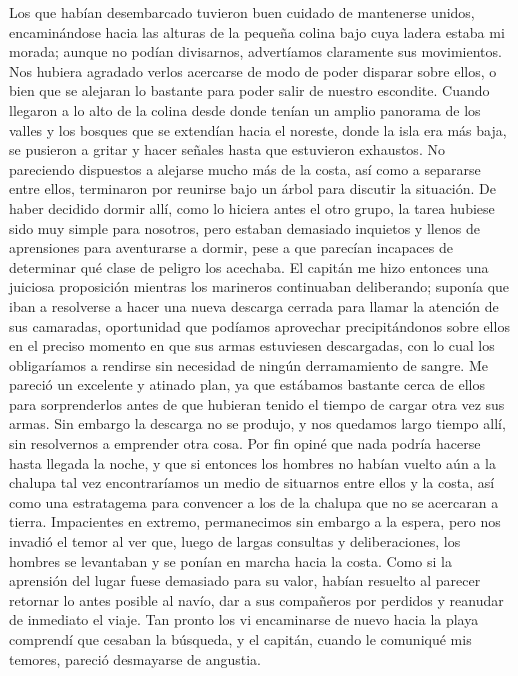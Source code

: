 \documentclass{novela}
\begin{document}
    Los que habían desembarcado tuvieron buen cuidado de mantenerse unidos, encaminándose hacia las alturas de la pequeña colina bajo cuya ladera estaba mi morada; aunque no podían divisarnos, advertíamos claramente sus movimientos. Nos hubiera agradado verlos acercarse de modo de poder disparar sobre ellos, o bien que se alejaran lo bastante para poder salir de nuestro escondite.
    Cuando llegaron a lo alto de la colina desde donde tenían un amplio panorama de los valles y los bosques que se extendían hacia el noreste, donde la isla era más baja, se pusieron a gritar y hacer señales hasta que estuvieron exhaustos. No pareciendo dispuestos a alejarse mucho más de la costa, así como a separarse entre ellos, terminaron por reunirse bajo un árbol para discutir la situación. De haber decidido dormir allí, como lo hiciera antes el otro grupo, la tarea hubiese sido muy simple para nosotros, pero estaban demasiado inquietos y llenos de aprensiones para aventurarse a dormir, pese a que parecían incapaces de determinar qué clase de peligro los acechaba.
    El capitán me hizo entonces una juiciosa proposición mientras los marineros continuaban deliberando; suponía que iban a resolverse a hacer una nueva descarga cerrada para llamar la atención de sus camaradas, oportunidad que podíamos aprovechar precipitándonos sobre ellos en el preciso momento en que sus armas estuviesen descargadas, con lo cual los obligaríamos a rendirse sin necesidad de ningún derramamiento de sangre.
    Me pareció un excelente y atinado plan, ya que estábamos bastante cerca de ellos para sorprenderlos antes de que hubieran tenido el tiempo de cargar otra vez sus armas.
    Sin embargo la descarga no se produjo, y nos quedamos largo tiempo allí, sin resolvernos a emprender otra cosa. Por fin opiné que nada podría hacerse hasta llegada la noche, y que si entonces los hombres no habían vuelto aún a la chalupa tal vez encontraríamos un medio de situarnos entre ellos y la costa, así como una estratagema para convencer a los de la chalupa que no se acercaran a tierra.
    Impacientes en extremo, permanecimos sin embargo a la espera, pero nos invadió el temor al ver que, luego de largas consultas y deliberaciones, los hombres se levantaban y se ponían en marcha hacia la costa. Como si la aprensión del lugar fuese demasiado para su valor, habían resuelto al parecer retornar lo antes posible al navío, dar a sus compañeros por perdidos y reanudar de inmediato el viaje.
    Tan pronto los vi encaminarse de nuevo hacia la playa comprendí que cesaban la búsqueda, y el capitán, cuando le comuniqué mis temores, pareció desmayarse de angustia.
\end{document}
